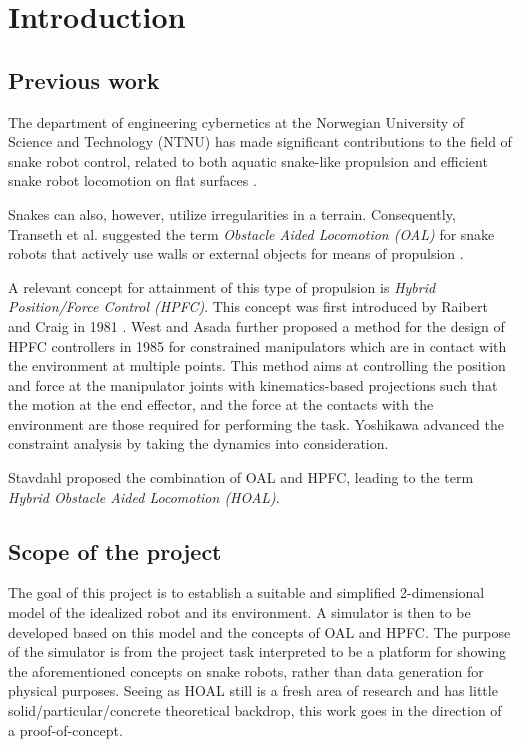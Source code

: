
\chapter{Introduction}\label{chapter:introduction}

\section{Previous work}
The department of engineering cybernetics at the Norwegian University of Science and Technology (NTNU) has made significant contributions to the field of snake robot control, related to both aquatic snake-like propulsion and efficient snake robot locomotion on flat surfaces \cite{StavdahlNote}.

Snakes can also, however, utilize irregularities in a terrain. Consequently, Transeth et al. suggested the term \textit{Obstacle Aided Locomotion (OAL)} for snake robots that actively use walls or external objects for means of propulsion \cite{transeth2008snake}.

A relevant concept for attainment of this type of propulsion is \textit{Hybrid Position/Force Control (HPFC)}. This concept was first introduced by Raibert and Craig in 1981 \cite{raibert1981hybrid}. West and Asada \cite{west1985method} further proposed a method for the design of HPFC controllers in 1985 for constrained manipulators which are in contact with the environment at multiple points. This method aims at controlling the position and force at the manipulator joints with kinematics-based projections such that the motion at the end effector, and the force at the contacts with the environment are those required for performing the task. Yoshikawa \cite{yoshikawa1987dynamic} advanced the constraint analysis by taking the dynamics into consideration.


Stavdahl \cite{StavdahlNote} proposed the combination of OAL and HPFC, leading to the term \textit{Hybrid Obstacle Aided Locomotion (HOAL)}. \\

\section{Scope of the project}
The goal of this project is to establish a suitable and simplified 2-dimensional model of the idealized robot and its environment. A simulator is then to be developed based on this model and the concepts of OAL and HPFC. The purpose of the simulator is from the project task interpreted to be a platform for showing the aforementioned concepts on snake robots, rather than data generation for physical purposes.
Seeing as HOAL still is a fresh area of research and has little solid/particular/concrete theoretical backdrop, this work goes in the direction of a proof-of-concept.

